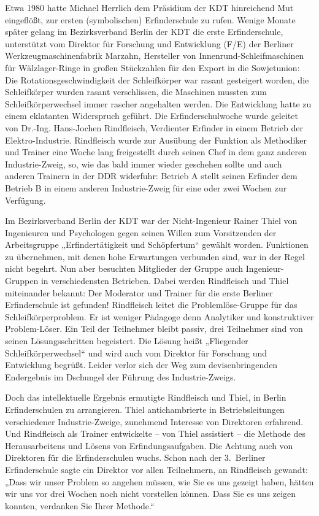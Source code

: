 \documentclass[12pt,a4paper]{article}
\begin{document}
Etwa 1980 hatte Michael Herrlich dem Präsidium der KDT hinreichend Mut
eingeflößt, zur ersten (symbolischen) Erfinderschule zu rufen. Wenige Monate
später gelang im Bezirksverband Berlin der KDT die erste Erfinderschule,
unterstützt vom Direktor für Forschung und Entwicklung (F/E) der Berliner
Werkzeugmaschinenfabrik Marzahn, Hersteller von Innenrund-Schleifmaschinen für
Wälzlager-Ringe in großen Stückzahlen für den Export in die Sowjetunion: Die
Rotationsgeschwindigkeit der Schleifkörper war rasant gesteigert worden, die
Schleifkörper wurden rasant verschlissen, die Maschinen mussten zum
Schleifkörperwechsel immer rascher angehalten werden. Die Entwicklung hatte zu
einem eklatanten Widerspruch geführt. Die Erfinderschulwoche wurde geleitet von
Dr.-Ing. Hans-Jochen Rindfleisch, Verdienter Erfinder in einem Betrieb der
Elektro-Industrie.  Rindfleisch wurde zur Ausübung der Funktion als Methodiker
und Trainer eine Woche lang freigestellt durch seinen Chef in dem ganz anderen
Industrie-Zweig, so, wie das bald immer wieder geschehen sollte und auch
anderen Trainern in der DDR widerfuhr: Betrieb A stellt seinen Erfinder dem
Betrieb B in einem anderen Industrie-Zweig für eine oder zwei Wochen zur
Verfügung.

Im Bezirksverband Berlin der KDT war der Nicht-Ingenieur Rainer Thiel von
Ingenieuren und Psychologen gegen seinen Willen zum Vorsitzenden der
Arbeitsgruppe „Erfindertätigkeit und Schöpfertum“ gewählt worden.  Funktionen
zu übernehmen, mit denen hohe Erwartungen verbunden sind, war in der Regel
nicht begehrt. Nun aber besuchten Mitglieder der Gruppe auch Ingenieur-Gruppen
in verschiedensten Betrieben. Dabei werden Rindfleisch und Thiel miteinander
bekannt: Der Moderator und Trainer für die erste Berliner Erfinderschule ist
gefunden! Rindfleisch leitet die Problemlöse-Gruppe für das
Schleifkörperproblem. Er ist weniger Pädagoge denn Analytiker und konstruktiver
Problem-Löser. Ein Teil der Teilnehmer bleibt passiv, drei Teilnehmer sind von
seinen Lösungsschritten begeistert.  Die Lösung heißt „Fliegender
Schleifkörperwechsel“ und wird auch vom Direktor für Forschung und Entwicklung
begrüßt. Leider verlor sich der Weg zum devisenbringenden Endergebnis im
Dschungel der Führung des Industrie-Zweigs.

Doch das intellektuelle Ergebnis ermutigte Rindfleisch und Thiel, in Berlin
Erfinderschulen zu arrangieren. Thiel antichambrierte in Betriebsleitungen
verschiedener Industrie-Zweige, zunehmend Interesse von Direktoren
erfahrend. Und Rindfleisch als Trainer entwickelte – von Thiel assistiert --
die Methode des Herausarbeitens und Lösens von Erfindungsaufgaben. Die Achtung
auch von Direktoren für die Erfinderschulen wuchs. Schon nach der 3.~Berliner
Erfinderschule sagte ein Direktor vor allen Teilnehmern, an Rindfleisch
gewandt: „Dass wir unser Problem so angehen müssen, wie Sie es uns gezeigt
haben, hätten wir uns vor drei Wochen noch nicht vorstellen können. Dass Sie es
uns zeigen konnten, verdanken Sie Ihrer Methode.“
\end{document}
